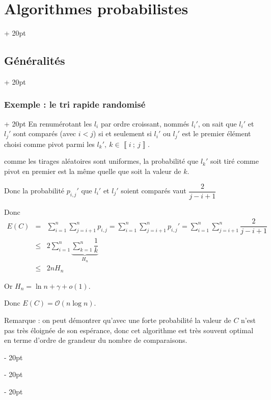 \documentclass[a4paper, 12pt, twoside]{article}
\newcommand{\nset}[2]{\left\llbracket #1\ ;\ #2 \right\rrbracket}
\renewcommand{\le}{\leqslant}
\newcommand{\ind}[1][20pt]{\advance\leftskip + #1}
\newcommand{\deind}[1][20pt]{\advance\leftskip - #1}
\newenvironment{indt}[2][20pt]{#2 \par \ind[#1]}{\par \deind} %
\newcommand{\1}{\mathbbm 1}
\begin{document}
\begin{indt}{\section{Algorithmes probabilistes}}
\begin{indt}{\subsection{Généralités}}
\begin{indt}{\subsubsection{Exemple : le tri rapide randomisé}}
                En renumérotant les $l_i$ par ordre croissant, nommés $l_i'$, on sait que $l_i'$ et $l_j'$ sont comparés (avec $i < j$) si et seulement si $l_i'$ ou $l_j'$ est le premier élément choisi comme pivot parmi les $l_k',\ k \in \nset i j$.

                comme les tirages aléatoires sont uniformes, la probabilité que $l_k'$ soit tiré comme pivot en premier est la même quelle que soit la valeur de $k$.

                Donc la probabilité $p_{i, j}'$ que $l_i'$ et $l_j'$  soient comparés vaut $\dfrac{2}{j - i + 1}$

                Donc
                \[
                    \begin{array}{rcl}
                        E(C)
                        &=& \displaystyle
                        \sum_{i = 1}^n \sum_{j = i + 1}^n p_{i, j}
                        = \sum_{i = 1}^n \sum_{j = i + 1}^n p_{i, j}'
                        = \sum_{i = 1}^n \sum_{j = i + 1}^n \dfrac{2}{j - i + 1}
                        \\
                        &\le& \displaystyle
                        2 \sum_{i = 1}^n \underbrace{\sum_{k = 1}^n \dfrac 1 k}_{H_n}
                        \\
                        &\le& 2n H_n
                    \end{array}
                \]

                Or $H_n = \ln n + \gamma + o(1)$.

                Donc $E(C) = \mathcal O(n\log n)$.

                \vspace{12pt}
                
                Remarque : on peut démontrer qu'avec une forte probabilité la valeur de $C$ n'est pas très éloignée de son espérance, donc cet algorithme est très souvent optimal en terme d'ordre de grandeur du nombre de comparaisons.
            \end{indt}
        \end{indt}
    \end{indt}
    
\end{document}
